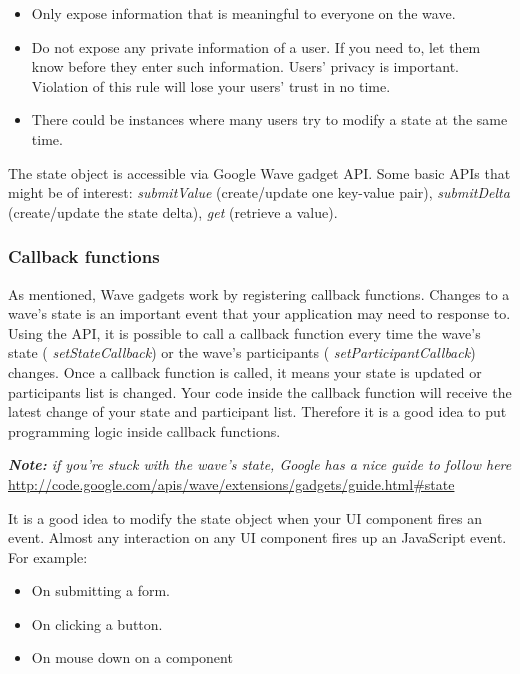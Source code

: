 \begin{itemize}
\item Only expose information that is meaningful to everyone on the wave.
\item Do not expose any private information of a user. If you need to,
let them know before they enter such information. Users' privacy is
important.  Violation of this rule will lose your users' trust in no
time.
\item There could be instances where many users try to modify a state 
at the same time.
\end{itemize}

The state object is accessible via Google Wave gadget API. Some basic
APIs that might be of interest: {\em submitValue} (create/update one
key-value pair), {\em submitDelta} (create/update the state delta),
{\em get} (retrieve a value).

\subsubsection{Callback functions}

As mentioned, Wave gadgets work by registering callback
functions. Changes to a wave's state is an important event that your
application may need to response to. Using the API, it is possible to
call a callback function every time the wave's state ({\em
setStateCallback}) or the wave's participants ({\em
setParticipantCallback}) changes. Once a callback function is called,
it means your state is updated or participants list is changed. Your
code inside the callback function will receive the latest change of
your state and participant list. Therefore it is a good idea to put
programming logic inside callback functions.



{\em \textbf{Note:} if you're stuck with the wave's state, Google has
a nice guide to follow
here} \url{http://code.google.com/apis/wave/extensions/gadgets/guide.html#state}

It is a good idea to modify the state object when your UI component
fires an event. Almost any interaction on any UI component fires up an
JavaScript event. For example:
\begin{itemize}
\item On submitting a form.
\item On clicking a button.
\item On mouse down on a component
\end{itemize}

